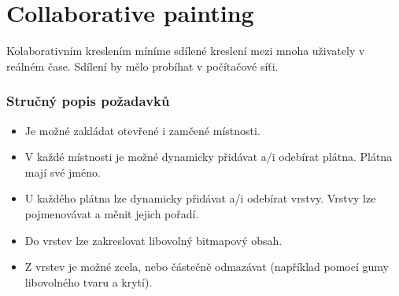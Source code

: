 \part{Collaborative painting}
\label{collaborative_painting}

Kolaborativním kreslením míníme sdílené kreslení mezi mnoha uživately v reálném čase. Sdílení by mělo probíhat v počítačové síťi.

\section{Stručný popis požadavků}

\begin{itemize}
	\item Je možné zakládat otevřené i zamčené místnosti.
	\item V každé místnosti je možné dynamicky přidávat a/i odebírat plátna. Plátna mají své jméno.
	\item U každého plátna lze dynamicky přidávat a/i odebírat vrstvy. Vrstvy lze pojmenovávat a měnit jejich pořadí.
	\item Do vrstev lze zakreslovat libovolný bitmapový obsah.
	\item Z vrstev je možné zcela, nebo částečně odmazávat (například pomocí gumy libovolného tvaru a krytí).
\end{itemize}
